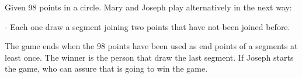 Given 98 points in a circle. Mary and Joseph play alternatively in the next way:

- Each one draw a segment joining two points that have not been  joined before.

The game ends when the 98 points have been used as end points of a segments at least once.  The winner is the person that draw the last segment. If Joseph starts the game, who can assure that is going to win the game.